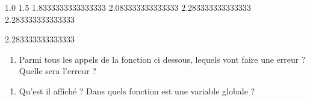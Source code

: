 \documentclass[letterpaper,10pt,english]{sphinxhowto}
\begin{document}
\begin{sphinxVerbatim}[commandchars=\\\{\}]
1.0
1.5
1.8333333333333333
2.083333333333333
2.283333333333333
2.283333333333333
\end{sphinxVerbatim}

\begin{sphinxVerbatim}[commandchars=\\\{\}]
2.283333333333333
\end{sphinxVerbatim}
\begin{enumerate}
%
\setcounter{enumi}{1}
\item {} 
\sphinxAtStartPar
Parmi tous les appels de la fonction  ci dessous, lequels vont faire une erreur ? Quelle sera l’erreur ?

\end{enumerate}

\begin{sphinxVerbatim}[commandchars=\\\{\}]
  
       

  \PYG{p}{[} \PYG{p}{]}
\end{sphinxVerbatim}

\begin{sphinxVerbatim}[commandchars=\\\{\}]
  
 
 
 
 
 
\PYG{p}{[} \PYG{p}{]}
\end{sphinxVerbatim}
\begin{enumerate}
%
\setcounter{enumi}{2}
\item {} 
\sphinxAtStartPar
Qu’est il affiché ? Dans quels fonction  est une variable globale ?

\end{enumerate}
\end{document}
